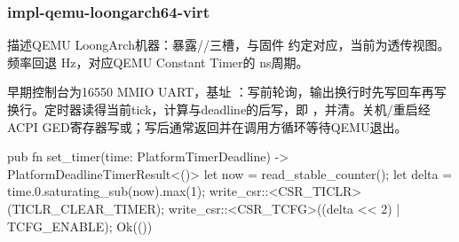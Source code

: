 
\subsubsection{impl-qemu-loongarch64-virt}

描述QEMU LoongArch机器：暴露//三槽，与固件  约定对应，当前为透传视图。频率回退 Hz，对应QEMU Constant Timer的 ns周期。

早期控制台为16550 MMIO UART，基址 ：写前轮询，输出换行时先写回车再写换行。定时器读得当前tick，计算与deadline的后写，即 ，并清。关机/重启经ACPI GED寄存器写或；写后通常返回并在调用方循环等待QEMU退出。

\begin{rustcode}
pub fn set_timer(time: PlatformTimerDeadline) -> PlatformDeadlineTimerResult<()> {
    let now = read_stable_counter();
    let delta = time.0.saturating_sub(now).max(1);
    write_csr::<CSR_TICLR>(TICLR_CLEAR_TIMER);
    write_csr::<CSR_TCFG>((delta << 2) | TCFG_ENABLE);
    Ok(())
}
\end{rustcode}
